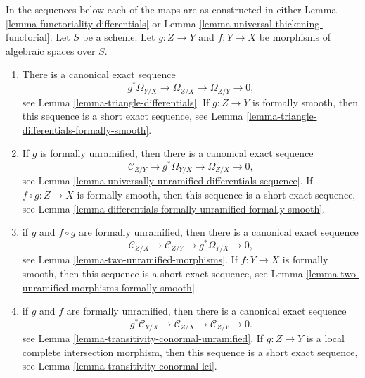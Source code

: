 \medskip\noindent
In the sequences below each of the maps
are as constructed in either
Lemma \ref{lemma-functoriality-differentials} or
Lemma \ref{lemma-universal-thickening-functorial}.
Let $S$ be a scheme. Let $g : Z \to Y$ and $f : Y \to X$ be morphisms of
algebraic spaces over $S$.
\begin{enumerate}
\item There is a canonical exact sequence
$$
g^*\Omega_{Y/X} \to \Omega_{Z/X} \to \Omega_{Z/Y} \to 0,
$$
see
Lemma \ref{lemma-triangle-differentials}.
If $g : Z \to Y$ is formally smooth, then this sequence is a short
exact sequence, see
Lemma \ref{lemma-triangle-differentials-formally-smooth}.
\item If $g$ is formally unramified, then there is a canonical exact sequence
$$
\mathcal{C}_{Z/Y} \to g^*\Omega_{Y/X} \to \Omega_{Z/X} \to 0,
$$
see
Lemma \ref{lemma-universally-unramified-differentials-sequence}.
If $f \circ g : Z \to X$ is formally smooth, then this sequence is a short
exact sequence, see
Lemma \ref{lemma-differentials-formally-unramified-formally-smooth}.
\item if $g$ and $f \circ g$ are formally unramified, then there is a
canonical exact sequence
$$
\mathcal{C}_{Z/X} \to \mathcal{C}_{Z/Y} \to g^*\Omega_{Y/X} \to 0,
$$
see
Lemma \ref{lemma-two-unramified-morphisms}.
If $f : Y \to X$ is formally smooth, then this sequence is a short
exact sequence, see
Lemma \ref{lemma-two-unramified-morphisms-formally-smooth}.
\item if $g$ and $f$ are formally unramified, then there is a canonical
exact sequence
$$
g^*\mathcal{C}_{Y/X} \to \mathcal{C}_{Z/X} \to \mathcal{C}_{Z/Y} \to 0.
$$
see
Lemma \ref{lemma-transitivity-conormal-unramified}.
If $g : Z \to Y$ is a local complete intersection morphism,
then this sequence is a short exact sequence, see
Lemma \ref{lemma-transitivity-conormal-lci}.
\end{enumerate}



















